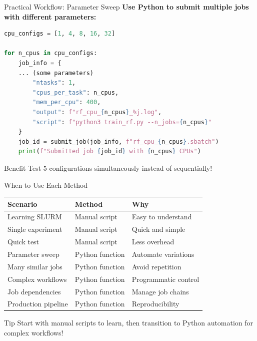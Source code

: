 \documentclass[aspectratio=169]{beamer}
\begin{document}
\begin{frame}[fragile]{Practical Workflow: Parameter Sweep}
\textbf{Use Python to submit multiple jobs with different parameters:}

\begin{lstlisting}[language=Python]
cpu_configs = [1, 4, 8, 16, 32]

for n_cpus in cpu_configs:
    job_info = {
    ... (some parameters)
        "ntasks": 1,
        "cpus_per_task": n_cpus,
        "mem_per_cpu": 400,
        "output": f"rf_cpu_{n_cpus}_%j.log",
        "script": f"python3 train_rf.py --n_jobs={n_cpus}"
    }
    job_id = submit_job(job_info, f"rf_cpu_{n_cpus}.sbatch")
    print(f"Submitted job {job_id} with {n_cpus} CPUs")
\end{lstlisting}

\begin{exampleblock}{Benefit}
Test 5 configurations simultaneously instead of sequentially!
\end{exampleblock}
\end{frame}

\begin{frame}{When to Use Each Method}
\begin{table}
\small
\begin{tabular}{lll}
\toprule
\textbf{Scenario} & \textbf{Method} & \textbf{Why} \\
\midrule
Learning SLURM & Manual script & Easy to understand \\
Single experiment & Manual script & Quick and simple \\
Quick test & Manual script & Less overhead \\
\midrule
Parameter sweep & Python function & Automate variations \\
Many similar jobs & Python function & Avoid repetition \\
Complex workflows & Python function & Programmatic control \\
Job dependencies & Python function & Manage job chains \\
Production pipeline & Python function & Reproducibility \\
\bottomrule
\end{tabular}
\end{table}

\vspace{0.5em}
\begin{exampleblock}{Tip}
Start with manual scripts to learn, then transition to Python automation for complex workflows!
\end{exampleblock}
\end{frame}
\end{document}
